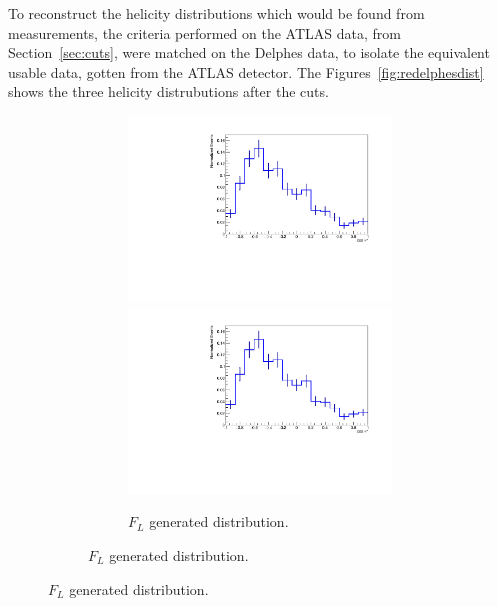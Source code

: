 \documentclass[12pt,a4paper]{article}
\numberwithin{equation}{section}
\begin{document}
To reconstruct the helicity distributions which would be found from
measurements, the criteria performed on the ATLAS data, from
Section~\ref{sec:cuts}, were matched on the Delphes data, to isolate the
equivalent usable data, gotten from the ATLAS detector. The
Figures~\ref{fig:redelphesdist} shows the three helicity distrubutions after the
cuts.
\begin{figure}[t!]
  \centering
  \begin{subfigure}[t]{0.5\textwidth}
    \centering
    \begin{subfigure}[t]{0.5\textwidth}
        \centering
        \includegraphics[width=1.0\textwidth]{figures/delphes_ctstarL}
    \includegraphics[width=1.0\textwidth]{figures/delphes_ctstarL}
    \caption{$F_L$ generated distribution.}
  \end{subfigure}%

\end{subfigure}
\end{figure}
\end{document}
